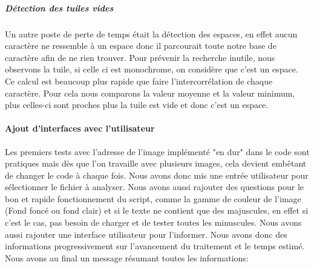 \documentclass[a4paper,12pt,titlepage]{report}
\begin{document}
\subparagraph{Détection des tuiles vides}
Un autre poste de perte de temps était la détection des espaces, en effet aucun caractère ne ressemble à un espace donc il parcourait toute notre base de caractère afin de ne rien trouver. Pour prévenir la recherche inutile, nous observons la tuile, si celle ci est monochrome, on considère que c'est un espace. Ce calcul est beaucoup plus rapide que faire l'intercorrélation de chaque caractère. Pour cela nous comparons la valeur moyenne et la valeur minimum, plus celles-ci sont proches plus la tuile est vide et donc c'est un espace.

\paragraph{Ajout d'interfaces avec l'utilisateur}
	Les premiers tests avec l'adresse de l'image implémenté "en dur" dans le code sont pratiques mais dès que l'on travaille avec plusieurs images, cela devient embêtant de changer le code à chaque fois. Nous avons donc mis une entrée utilisateur pour sélectionner le fichier à analyser.
	Nous avons aussi rajouter des questions pour le bon et rapide fonctionnement du script, comme la gamme de couleur de l'image (Fond foncé ou fond clair) et si le texte ne contient que des majuscules, en effet si c'est le cas, pas besoin de charger et de tester toutes les minuscules.
	Nous avons aussi rajouter une interface utilisateur pour l'informer. Nous avons donc des informations progressivement sur l'avancement du traitement et le temps estimé. Nous avons au final un message résumant toutes les informations:\\
\end{document}
